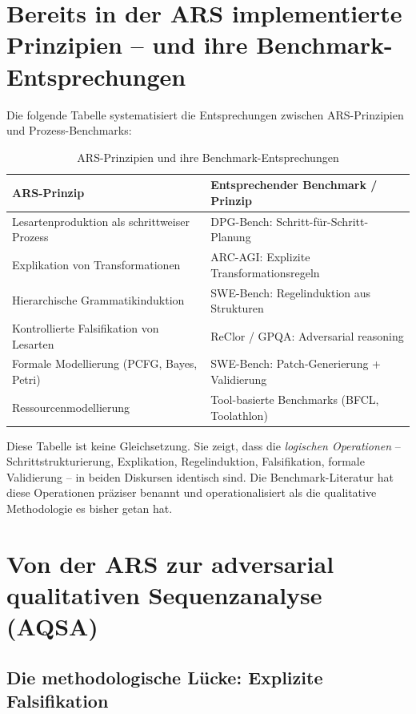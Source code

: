 \documentclass[12pt,a4paper]{article}
\begin{document}
\section{Bereits in der ARS implementierte Prinzipien – und ihre Benchmark-Entsprechungen}

Die folgende Tabelle systematisiert die Entsprechungen zwischen ARS-Prinzipien und Prozess-Benchmarks:

\begin{table}[H]
\centering
\caption{ARS-Prinzipien und ihre Benchmark-Entsprechungen}
\label{tab:mapping}
\begin{tabular}{@{}p{}p{}@{}}
\toprule
ARS-Prinzip & Entsprechender Benchmark / Prinzip \\
\midrule
Lesartenproduktion als schrittweiser Prozess & DPG-Bench: Schritt-für-Schritt-Planung \\
Explikation von Transformationen & ARC-AGI: Explizite Transformationsregeln \\
Hierarchische Grammatikinduktion & SWE-Bench: Regelinduktion aus Strukturen \\
Kontrollierte Falsifikation von Lesarten & ReClor / GPQA: Adversarial reasoning \\
Formale Modellierung (PCFG, Bayes, Petri) & SWE-Bench: Patch-Generierung + Validierung \\
Ressourcenmodellierung & Tool-basierte Benchmarks (BFCL, Toolathlon) \\
\bottomrule
\end{tabular}
\end{table}

Diese Tabelle ist keine Gleichsetzung. Sie zeigt, dass die \textit{logischen Operationen} – Schrittstrukturierung, Explikation, Regelinduktion, Falsifikation, formale Validierung – in beiden Diskursen identisch sind. Die Benchmark-Literatur hat diese Operationen präziser benannt und operationalisiert als die qualitative Methodologie es bisher getan hat.

\section{Von der ARS zur adversarial qualitativen Sequenzanalyse (AQSA)}

\subsection{Die methodologische Lücke: Explizite Falsifikation}
\end{document}
